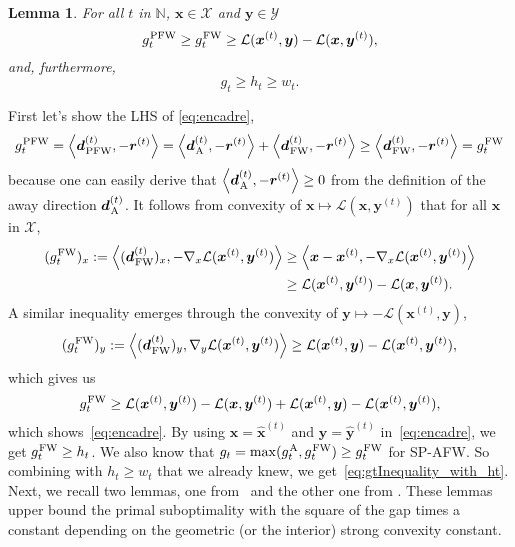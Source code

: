 \documentclass[twoside]{article}
\newcommand{\N}{\mathbb{N}}
\renewcommand{\L}{\mathcal{L}}
\newcommand{\X}{\mathcal{X}}
\newcommand{\Y}{\mathcal{Y}}
\newcommand{\prodscal}[2]{\left\langle#1,#2\right\rangle}
\newcommand{\x}{\bm{x}}
\newcommand{\y}{\bm{y}}
\newcommand{\xt}{\bm{x}^{(t)}}
\newcommand{\dt}{\bm{d}^{(t)}}
\newcommand{\rt}{\r^{(t)}}
\newcommand{\yt}{\bm{y}^{(t)}}
\newcommand{\xtm}{\widehat{\bm{x}}^{(t)}}
\newcommand{\ytm}{\widehat{\bm{y}}^{(t)}}
\newcommand{\wt}{w_t}
\newcommand{\gnx}{\nabla_x\L(\xt,\yt)}
\newcommand{\gny}{\nabla_y\L(\xt,\yt)}
\newcommand{\gap}{g_{t}}
\newtheorem{lemma}[definition]{Lemma}
\newcommand{\FW}{{\hspace{0.05em}\textnormal{FW}}}
\newcommand{\PW}{{\hspace{0.05em}\textnormal{PFW}}}
\newcommand{\away}{{\hspace{0.05em}\textnormal{A}}}
\renewcommand{\r}{\bm{r}}
\newcommand{\0}{\mathbf{0}} %
\begin{document}
  \begin{lemma} \label{lemme:g}
    For all $t$ in $\N$, $\x\in \X$ and $ \y \in \Y$
      \begin{equation} \label{eq:encadre}
      \gap^{\PW} \geq \gap^{\FW} \geq  \L(\xt,\y)-\L(\x, \yt),
      \end{equation}
    and, furthermore,
      \begin{equation} \label{eq:gtInequality_with_ht}
      \gap \geq  h_t  \geq \wt.
      \end{equation}
  \end{lemma}
  \proof 
    First let's show the LHS of \eqref{eq:encadre}, 
    \begin{equation}
      \gap^{\PW} = \prodscal{\dt_{\PW}}{-\rt} = \prodscal{\dt_{\away}}{-\rt} + \prodscal{\dt_{\FW}}{-\rt} \geq \prodscal{\dt_{\FW}}{-\rt} = \gap^{\FW}
    \end{equation}
    because one can easily derive that $\prodscal{\dt_{\away}}{-\rt}\geq 0$ from the definition of the away direction $\dt_{\away}$.
    It follows from convexity of $\x \mapsto \L(\x, \yt)$ that for all $\x$ in $\X$, 
        \begin{align} \label{eq:gapx}
           (\gap^{\FW})_{x} :=\prodscal{ (\dt_{\FW})_x}{ -\gnx}
              & \geq \prodscal{ \x - \xt}{-\gnx}\\
              &\geq \L(\xt,\yt) - \L(\x, \yt). 
        \end{align}
    A similar inequality emerges through the convexity of $\y \mapsto -\L(\xt,\y)$,
      \begin{equation}
        (\gap^{\FW})_{y} := \prodscal{ (\dt_{\FW})_y}{\gny} \geq \L(\xt, \y) - \L(\xt,\yt),
      \end{equation}
    which gives us 
      \begin{equation} 
      \gap^{\FW} \geq \L(\xt, \yt) - \L(\x, \yt) + \L(\xt, \y) - \L(\xt , \yt) ,
      \end{equation}
     which shows~\eqref{eq:encadre}.
     By using $\x = \xtm$ and $\y = \ytm$ in~\eqref{eq:encadre}, we get $\gap^{\FW} \geq h_t$. We also know that $g_t = \max(\gap^\away, \gap^\FW) \geq \gap^{\FW}$ for SP-AFW. So combining with $h_t \geq w_t$ that we already knew, we get~\eqref{eq:gtInequality_with_ht}.
  \endproof
  Next, we recall two lemmas, one from~ and the other one from \citep{lacoste2015global}. These lemmas upper bound the primal suboptimality with the square of the gap times a constant depending on the geometric (or the interior) strong convexity constant.
\end{document}
